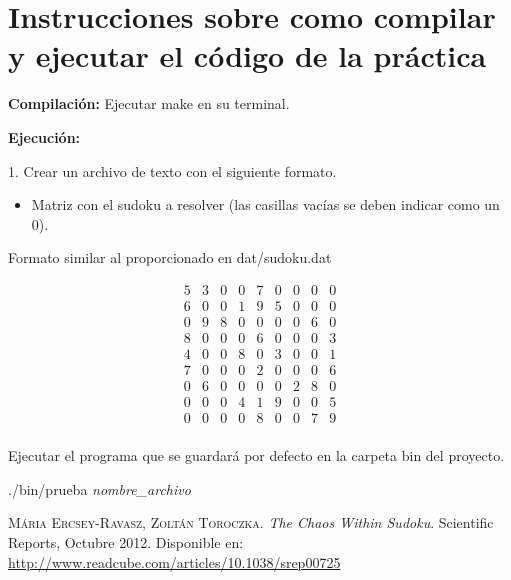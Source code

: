 \documentclass[11pt, a4paper]{article}
\theoremstyle{theorem-style}
\theoremstyle{definition-style}
\theoremstyle{remark-style}
\theoremstyle{example-style}
\begin{document}
\section{Instrucciones sobre como compilar y ejecutar el código de la práctica}


\textbf{Compilación:} Ejecutar make en su terminal.

\textbf{Ejecución:} 

1. Crear un archivo de texto con el siguiente formato.
\begin{itemize}
\item Matriz con el sudoku a resolver (las casillas vacías se deben indicar como un 0).
\end{itemize}

Formato similar al proporcionado en dat/sudoku.dat

\[
\begin{array}{ccccccccc}
5 & 3 & 0 & 0 & 7 & 0 & 0 & 0 & 0\\
6 & 0 & 0 & 1 & 9 & 5 & 0 & 0 & 0\\
0 & 9 & 8 & 0 & 0 & 0 & 0 & 6 & 0\\
8 & 0 & 0 & 0 & 6 & 0 & 0 & 0 & 3\\
4 & 0 & 0 & 8 & 0 & 3 & 0 & 0 & 1\\
7 & 0 & 0 & 0 & 2 & 0 & 0 & 0 & 6\\
0 & 6 & 0 & 0 & 0 & 0 & 2 & 8 & 0\\
0 & 0 & 0 & 4 & 1 & 9 & 0 & 0 & 5\\
0 & 0 & 0 & 0 & 8 & 0 & 0 & 7 & 9\\
\end{array}
\]

Ejecutar el programa que se guardará por defecto en la carpeta bin del proyecto. 

./bin/prueba \textit{nombre\_archivo}
\begin{thebibliography}{X}
 \textsc{Mária Ercsey-Ravasz, Zoltán Toroczka}.
\textit{The Chaos Within Sudoku}.
Scientific Reports, Octubre 2012. Disponible en: \url{http://www.readcube.com/articles/10.1038/srep00725}
\end{thebibliography}	
\end{document}
